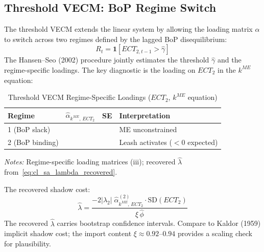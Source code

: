 \subsection{Threshold VECM: BoP Regime Switch}
\label{app:cl:threshold}

The threshold VECM extends the linear system by allowing the
loading matrix $\alpha$ to switch across two regimes defined by the
lagged BoP disequilibrium:
%
\begin{equation}
R_t = \mathbf{1}\!\left[ECT_{2,t-1} > \hat{\gamma}\right]
\label{eq:cl_sa_regime_indicator}
\end{equation}
%
The Hansen--Seo (2002) procedure jointly estimates the threshold
$\hat{\gamma}$ and the regime-specific loadings. The key diagnostic
is the loading on $ECT_2$ in the $k^{ME}$ equation:
%
\begin{table}[htbp]
\centering
\caption{Threshold VECM Regime-Specific Loadings ($ECT_2$, $k^{ME}$ equation)}
\label{tab:cl:sa:tvecm_loadings}
\begin{threeparttable}
\begin{tabular}{lrrl}
\toprule
Regime & $\hat{\alpha}_{k^{ME},\,ECT_2}$ & SE & Interpretation \\
\midrule
1 (BoP slack) &  &
& ME unconstrained \\
2 (BoP binding) &  &
& Leash activates ($< 0$ expected) \\
\bottomrule
\end{tabular}
\begin{tablenotes}
\small
\item \textit{Notes:} Regime-specific loading matrices (iii); recovered $\hat{\lambda}$
from~\eqref{eq:cl_sa_lambda_recovered}.
\end{tablenotes}
\end{threeparttable}
\end{table}

The recovered shadow cost:
%
\begin{equation}
\hat{\lambda} = \frac{-2|\lambda_2|\;
\hat{\alpha}^{(2)}_{k^{ME},\,ECT_2}
\cdot \text{SD}(ECT_2)}{\xi\,\hat{\phi}}
\label{eq:cl_sa_lambda_recovered}
\end{equation}
%
The recovered $\hat{\lambda}$ carries bootstrap confidence intervals.
Compare to Kaldor (1959) implicit shadow cost; the import
content $\xi \approx 0.92$--$0.94$ provides a scaling check for plausibility.


